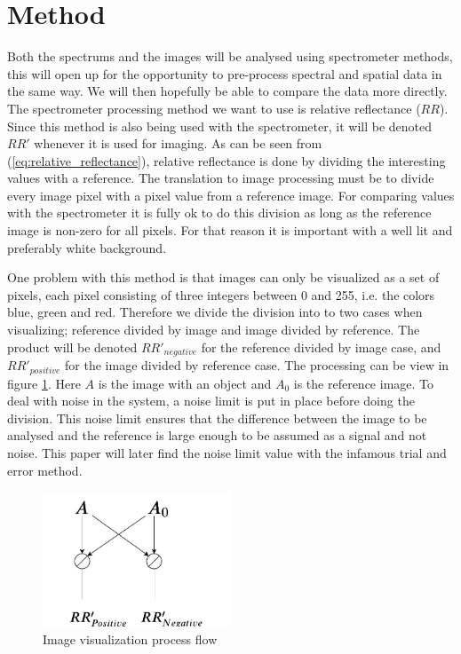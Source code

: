 \section{Method}
Both the spectrums and the images will be analysed using spectrometer methods, this will open up for the opportunity to pre-process spectral and spatial data in the same way. We will then hopefully be able to compare the data more directly. The spectrometer processing method we want to use is relative reflectance ($RR$). Since this method is also being used with the spectrometer, it will be denoted $RR'$ whenever it is used for imaging. As can be seen from (\ref{eq:relative_reflectance}), relative reflectance is done by dividing the interesting values with a reference. The translation to image processing must be to divide every image pixel with a pixel value from a reference image. For comparing values with the spectrometer it is fully ok to do this division as long as the reference image is non-zero for all pixels. For that reason it is important with a well lit and preferably white background. 


One problem with this method is that images can only be visualized as a set of pixels, each pixel consisting of three integers between 0 and 255, i.e. the colors blue, green and red. Therefore we divide the division into to two cases when visualizing; reference divided by image and image divided by reference. The product will be denoted $RR'_{negative}$ for the reference divided by image case, and $RR'_{positive}$ for the image divided by reference case. The processing can be view in figure \ref{fig:image_visualization_program_flow}. Here $A$ is the image with an object and $A_0$ is the reference image. To deal with noise in the system, a noise limit is put in place before doing the division. This noise limit ensures that the difference between the image to be analysed and the reference is large enough to be assumed as a signal and not noise. This paper will later find the noise limit value with the infamous trial and error method. 

\begin{figure}[h]
    \centering
    \includegraphics[width=0.5\textwidth]{figures/image_program_flow.pdf}
    \caption{Image visualization process flow}
    \label{fig:image_visualization_program_flow}
\end{figure}


